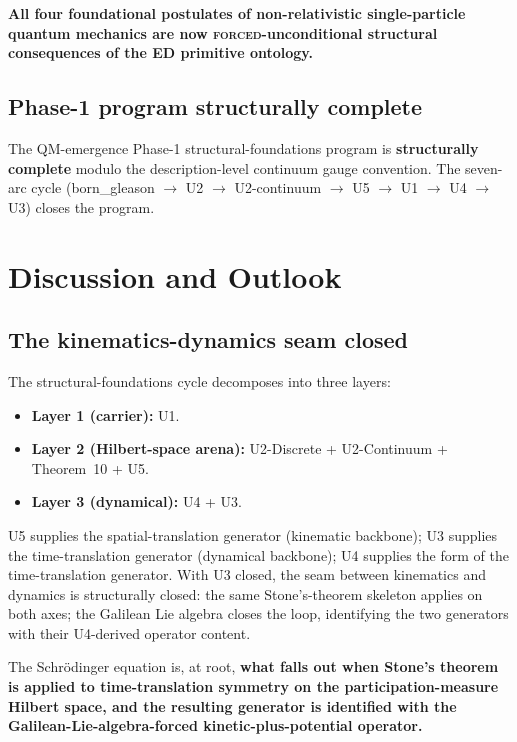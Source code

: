 \documentclass[11pt,a4paper]{article}
\begin{document}
\textbf{All four foundational postulates of non-relativistic single-particle quantum mechanics are now \textsc{forced}-unconditional structural consequences of the ED primitive ontology.}

\subsection{Phase-1 program structurally complete}

The QM-emergence Phase-1 structural-foundations program is \textbf{structurally complete} modulo the description-level continuum gauge convention. The seven-arc cycle (born\_gleason $\to$ U2 $\to$ U2-continuum $\to$ U5 $\to$ U1 $\to$ U4 $\to$ U3) closes the program.

\section{Discussion and Outlook}\label{sec:discussion}

\subsection{The kinematics-dynamics seam closed}

The structural-foundations cycle decomposes into three layers:

\begin{itemize}
  \item \textbf{Layer 1 (carrier):} U1.
  \item \textbf{Layer 2 (Hilbert-space arena):} U2-Discrete + U2-Continuum + Theorem~10 + U5.
  \item \textbf{Layer 3 (dynamical):} U4 + U3.
\end{itemize}

U5 supplies the spatial-translation generator (kinematic backbone); U3 supplies the time-translation generator (dynamical backbone); U4 supplies the form of the time-translation generator. With U3 closed, the seam between kinematics and dynamics is structurally closed: the same Stone's-theorem skeleton applies on both axes; the Galilean Lie algebra closes the loop, identifying the two generators with their U4-derived operator content.

The Schr\"odinger equation is, at root, \textbf{what falls out when Stone's theorem is applied to time-translation symmetry on the participation-measure Hilbert space, and the resulting generator is identified with the Galilean-Lie-algebra-forced kinetic-plus-potential operator.}
\end{document}
